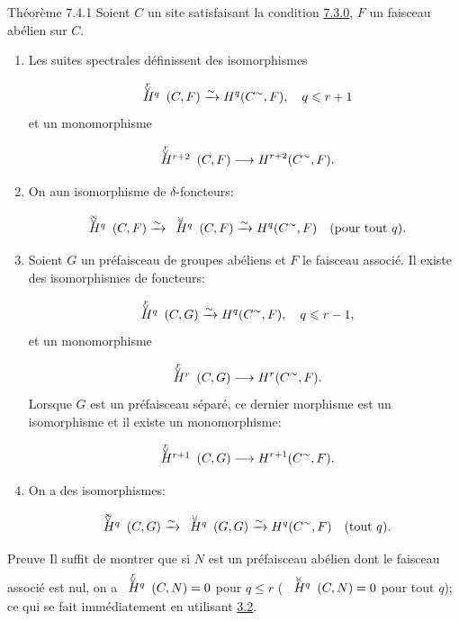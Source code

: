 \documentclass[10pt]{../fichiers-configuration-latex/smfart}
\begin{document}
\begin{enonce*}{Théorème 7.4.1}
Soient $C$ un site satisfaisant la condition \hyperref[V.subsubsec7.3.0]{7.3.0}, $F$ un faisceau
abélien sur $C$.
\begin{enumerate}
\renewcommand{\labelenumi}{\theenumi)}
\item Les suites spectrales  définissent des isomorphismes
$$
\Hvr{q} (C, F) \xrightarrow{\sim}
H^q(C^{\sim}, F),\quad q \leq r+1
$$
et un monomorphisme
$$
\Hvr{r+2} (C, F) \longrightarrow
H^{r+2}(C^{\sim}, F){\quoi}.
$$

\item On a\pageoriginale un isomorphisme de $\delta$-foncteurs:
$$
\Hvi{q} (C, F) \xrightarrow{\sim}
\Hvv{q} (C, F)
\xrightarrow{\sim} H^q(C^{\sim}, F)\quad (\text{pour tout } q){\quoi}.
$$

\item Soient $G$ un préfaisceau de groupes abéliens et $F$ le
  faisceau associé. Il existe des isomorphismes de foncteurs:
$$
\Hvr{q} (C, G) \xrightarrow{\sim}
H^q(C^{\sim}, F),\quad q \leq r-1{\quoi},
$$
et un monomorphisme
$$
\Hvr{r}(C, G) \longrightarrow
H^r(C^{\sim}, F){\quoi}.
$$
Lorsque $G$ est un préfaisceau séparé, ce dernier morphisme est un
isomorphisme et il existe un monomorphisme:
$$
\Hvr{r+1}(C, G) \to H^{r+1}(C^{\sim},F){\quoi}.
$$

\item On a des isomorphismes:
$$
\Hvi{q}(C, G) \xrightarrow{\sim}
\Hvv{q}(G, G)
\xrightarrow{\sim}H^q(C^{\sim}, F)\quad (\text{tout } q){\quoi}.
$$
\end{enumerate}
\end{enonce*}

\begin{enonce*}[remark]{Preuve}
Il suffit de montrer que si $N$ est un préfaisceau abélien dont le
faisceau associé est nul, on a
$\Hvr{q}(C, N) = 0$ pour $q \leq r$ (\resp
$\Hvv{q}(C, N) = 0$ pour tout
 $q$); ce qui se fait immédiatement en utilisant \hyperref[V.thm3.2]{3.2}.
\end{enonce*}
\end{document}
